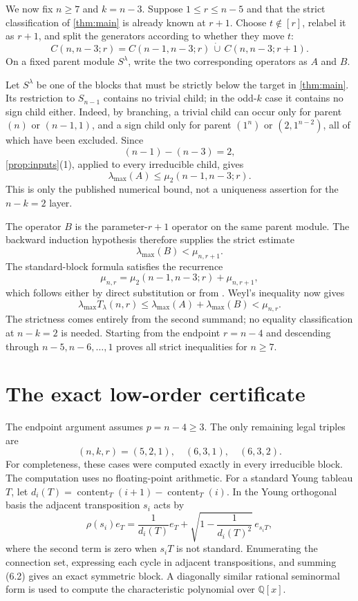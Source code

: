 \documentclass[11pt]{article}
\theoremstyle{definition}
\newcommand{\lmax}{\lambda_{\max}}
\begin{document}
We now fix $n\geq7$ and $k=n-3$.  Suppose
$1\leq r\leq n-5$ and that the strict classification of
\cref{thm:main} is already known at $r+1$.  Choose
$t\notin[r]$, relabel it as $r+1$, and split the generators according to
whether they move $t$:
\[
 C(n,n-3;r)
 =C(n-1,n-3;r)\,\dot\cup\,C(n,n-3;r+1).
 \tag{5.1}
\]
On a fixed parent module $S^\lambda$, write the two corresponding operators
as $A$ and $B$.

Let $S^\lambda$ be one of the blocks that must be strictly below the target
in \cref{thm:main}.  Its restriction to $S_{n-1}$ contains no trivial
child; in the odd-$k$ case it contains no sign child either.  Indeed, by
branching, a trivial child can occur only for parent $(n)$ or $(n-1,1)$,
and a sign child only for parent $(1^n)$ or $(2,1^{n-2})$, all of which have
been excluded.  Since
\[
 (n-1)-(n-3)=2,
\]
\cref{prop:inputs}(1), applied to every irreducible child, gives
\[
 \lmax(A)\leq\mu_2(n-1,n-3;r).
 \tag{5.2}
\]
This is only the published numerical bound, not a uniqueness assertion for
the $n-k=2$ layer.

The operator $B$ is the parameter-$r+1$ operator on the same parent module.
The backward induction hypothesis therefore supplies the strict estimate
\[
 \lmax(B)<\mu_{n,r+1}.
 \tag{5.3}
\]
The standard-block formula satisfies the recurrence
\[
 \mu_{n,r}=\mu_2(n-1,n-3;r)+\mu_{n,r+1},
 \tag{5.4}
\]
which follows either by direct substitution or from
\cite[Equation~(10)]{LiXiaZhou2026}.  Weyl's inequality now gives
\[
 \lmax T_\lambda(n,r)
 \leq\lmax(A)+\lmax(B)
 <\mu_{n,r}.
\]
The strictness comes entirely from the second summand; no equality
classification at $n-k=2$ is needed.  Starting from the endpoint
$r=n-4$ and descending through $n-5,n-6,\dots,1$ proves all strict
inequalities for $n\geq7$.

\section{The exact low-order certificate}

The endpoint argument assumes $p=n-4\geq3$.  The only remaining legal
triples are
\[
 (n,k,r)=(5,2,1),\quad(6,3,1),\quad(6,3,2).
 \tag{6.1}
\]
For completeness, these cases were computed exactly in every irreducible
block.  The computation uses no floating-point arithmetic.  For a standard
Young tableau $T$, let
$d_i(T)=\operatorname{content}_T(i+1)-\operatorname{content}_T(i)$.  In the
Young orthogonal basis the adjacent transposition $s_i$ acts by
\[
 \rho(s_i)e_T=\frac1{d_i(T)}e_T
 +\sqrt{1-\frac1{d_i(T)^2}}\,e_{s_iT},
 \tag{6.2}
\]
where the second term is zero when $s_iT$ is not standard.  Enumerating the
connection set, expressing each cycle in adjacent transpositions, and
summing (6.2) gives an exact symmetric block.  A diagonally similar rational
seminormal form is used to compute the characteristic polynomial over
$\mathbb Q[x]$.
\end{document}
